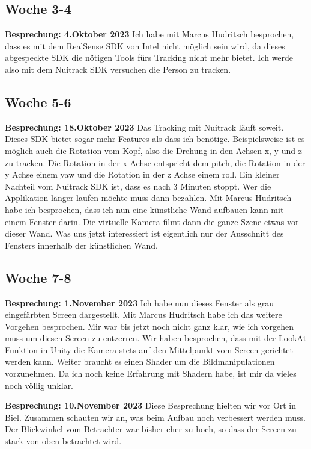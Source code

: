 \subsection{Woche 3-4}
\textbf{Besprechung: 4.Oktober 2023}
Ich habe mit Marcus Hudritsch besprochen, dass es mit dem RealSense SDK von Intel nicht möglich sein wird, da dieses abgespeckte SDK die nötigen Tools fürs Tracking nicht mehr bietet. Ich werde also mit dem Nuitrack SDK versuchen die Person zu tracken.

\subsection{Woche 5-6}
\textbf{Besprechung: 18.Oktober 2023}
Das Tracking mit Nuitrack läuft soweit. Dieses SDK bietet sogar mehr Features als dass ich benötige. Beispielsweise ist es m\"oglich auch die Rotation vom Kopf, also die Drehung in den Achsen x, y und z zu tracken. Die Rotation in der x Achse entspricht dem pitch, die Rotation in der y Achse einem yaw und die Rotation in der z Achse einem roll.
Ein kleiner Nachteil vom Nuitrack SDK ist, dass es nach 3 Minuten stoppt. Wer die Applikation länger laufen möchte muss dann bezahlen.
Mit Marcus Hudritsch habe ich besprochen, dass ich nun eine künstliche Wand aufbauen kann mit einem Fenster darin. Die virtuelle Kamera filmt dann die ganze Szene etwas vor dieser Wand. Was uns jetzt interessiert ist eigentlich nur der Ausschnitt des Fensters innerhalb der k\"unstlichen Wand.

\subsection{Woche 7-8}
\textbf{Besprechung: 1.November 2023}
Ich habe nun dieses Fenster als grau eingefärbten Screen dargestellt. Mit Marcus Hudritsch habe ich das weitere Vorgehen besprochen. Mir war bis jetzt noch nicht ganz klar, wie ich vorgehen muss um diesen Screen zu entzerren.
Wir haben besprochen, dass mit der LookAt Funktion in Unity die Kamera stets auf den Mittelpunkt vom Screen gerichtet werden kann. Weiter braucht es einen Shader um die Bildmanipulationen vorzunehmen. Da ich noch keine Erfahrung mit Shadern habe, ist mir da vieles noch völlig unklar.

\textbf{Besprechung: 10.November 2023}
Diese Besprechung hielten wir vor Ort in Biel. Zusammen schauten wir an, was beim Aufbau noch verbessert werden muss. Der Blickwinkel vom Betrachter war bisher eher zu hoch, so dass der Screen zu stark von oben betrachtet wird.

